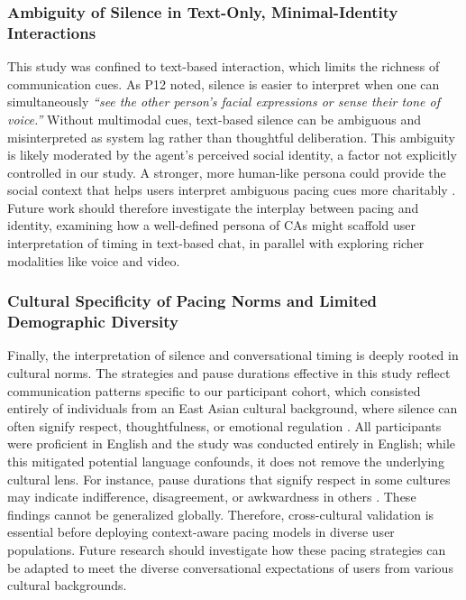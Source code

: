 \subsubsection{Ambiguity of Silence in Text-Only, Minimal-Identity Interactions}
This study was confined to text-based interaction, which limits the richness of communication cues. As P12 noted, silence is easier to interpret when one can simultaneously \textit{``see the other person's facial expressions or sense their tone of voice.''} Without multimodal cues, text-based silence can be ambiguous and misinterpreted as system lag rather than thoughtful deliberation.
This ambiguity is likely moderated by the agent's perceived social identity, a factor not explicitly controlled in our study. A stronger, more human-like persona could provide the social context that helps users interpret ambiguous pacing cues more charitably \cite{li2025exploring}. Future work should therefore investigate the interplay between pacing and identity, examining how a well-defined persona of CAs might scaffold user interpretation of timing in text-based chat, in parallel with exploring richer modalities like voice and video.


\subsubsection{Cultural Specificity of Pacing Norms and Limited Demographic Diversity}
\label{subsubsec:culture}
Finally, the interpretation of silence and conversational timing is deeply rooted in cultural norms. 
The strategies and pause durations effective in this study reflect communication patterns specific to our participant cohort, which consisted entirely of individuals from an East Asian cultural background, where silence can often signify respect, thoughtfulness, or emotional regulation \cite{quan2015analysis}. All participants were proficient in English and the study was conducted entirely in English; while this mitigated potential language confounds, it does not remove the underlying cultural lens.
For instance, pause durations that signify respect in some cultures may indicate indifference, disagreement, or awkwardness in others \cite{ling2003communicative}. These findings cannot be generalized globally. Therefore, cross-cultural validation is essential before deploying context-aware pacing models in diverse user populations. Future research should investigate how these pacing strategies can be adapted to meet the diverse conversational expectations of users from various cultural backgrounds.

